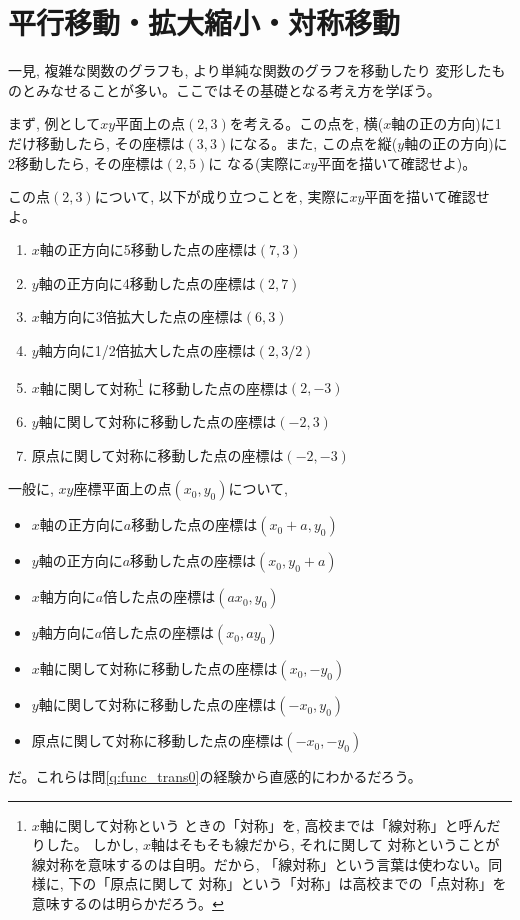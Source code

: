 \section{平行移動・拡大縮小・対称移動}\label{sec:func_trans}

一見, 複雑な関数のグラフも, より単純な関数のグラフを移動したり
変形したものとみなせることが多い。ここではその基礎となる考え方を学ぼう。

まず, 例として$xy$平面上の点$(2,3)$を考える。この点を, 
横($x$軸の正の方向)に1だけ移動したら, その座標は$(3,3)$になる。また, 
この点を縦($y$軸の正の方向)に2移動したら, その座標は$(2, 5)$に
なる(実際に$xy$平面を描いて確認せよ)。

\begin{q}\label{q:func_trans0} この点$(2, 3)$について, 以下が成り立つことを, 
実際に$xy$平面を描いて確認せよ。
\begin{enumerate}
\item $x$軸の正方向に5移動した点の座標は$(7, 3)$
\item $y$軸の正方向に4移動した点の座標は$(2, 7)$
\item $x$軸方向に3倍拡大した点の座標は$(6, 3)$
\item $y$軸方向に1/2倍拡大した点の座標は$(2, 3/2)$
\item $x$軸に関して対称\footnote{$x$軸に関して対称という
ときの「対称」を, 高校までは「線対称」と呼んだりした。
しかし, $x$軸はそもそも線だから, それに関して
対称ということが線対称を意味するのは自明。だから, 
「線対称」という言葉は使わない。同様に, 下の「原点に関して
対称」という「対称」は高校までの「点対称」を意味するのは明らかだろう。}
に移動した点の座標は$(2, -3)$
\item $y$軸に関して対称に移動した点の座標は$(-2, 3)$
\item 原点に関して対称に移動した点の座標は$(-2, -3)$
\end{enumerate}\end{q}
\mv

一般に, $xy$座標平面上の点$(x_0, y_0)$について, 
\begin{itemize}
\item $x$軸の正方向に$a$移動した点の座標は$(x_0+a, y_0)$
\item $y$軸の正方向に$a$移動した点の座標は$(x_0, y_0+a)$
\item $x$軸方向に$a$倍した点の座標は$(ax_0, y_0)$
\item $y$軸方向に$a$倍した点の座標は$(x_0, ay_0)$
\item $x$軸に関して対称に移動した点の座標は$(x_0, -y_0)$
\item $y$軸に関して対称に移動した点の座標は$(-x_0, y_0)$
\item 原点に関して対称に移動した点の座標は$(-x_0, -y_0)$
\end{itemize}
だ。これらは問\ref{q:func_trans0}の経験から直感的にわかるだろう。\hv

